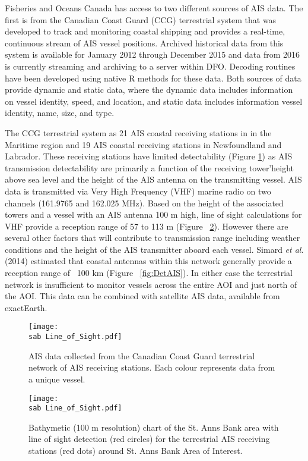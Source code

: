 \documentclass[letterpaper,portrait,11pt]{scrartcl}
\numberwithin{equation}{section}		%
\numberwithin{figure}{section}			%
\numberwithin{table}{section}				%
\newcommand{\ecomod}{\string~/ecomod_data/}   %
\newcommand{\sab}{\ecomod/mpa/sab/}   %
\begin{document}
Fisheries and Oceans Canada has access to two different sources of AIS data.  The first is from the Canadian Coast Guard (CCG) terrestrial system that was developed to track and monitoring coastal shipping and provides a real-time, continuous stream of AIS vessel positions.  Archived historical data from this system is available for January 2012 through December 2015 and data from 2016 is currently streaming and archiving to a server within DFO. Decoding routines have been developed using native R methods for these data.   Both sources of data provide dynamic and static data, where the dynamic data includes information on vessel identity, speed, and location, and static data includes information vessel identity, name, size, and type.   

The CCG terrestrial system as 21 AIS coastal receiving stations in in the Maritime region and 19 AIS coastal receiving stations in Newfoundland and Labrador.  These receiving stations have limited detectability (Figure \ref{fig:TAIS}) as AIS transmission detectability are primarily a function of the receiving tower\textquoteright height above sea level and the height of the AIS antenna on the transmitting vessel.  AIS data is transmitted via Very High Frequency (VHF) marine radio on two channels (161.9765 and 162.025 MHz).  Based on the height of the associated towers and a vessel with an AIS antenna 100 m high, line of sight calculations for VHF provide a reception range of  57 to 113 m (Figure ~\ref{fig:LOF}).  However there are several other factors that will contribute to transmission range including weather conditions and the height of the AIS transmitter aboard each vessel.  Simard \textit{et al}. (2014) estimated that coastal antennas within this network generally provide a reception range of ~100 km (Figure ~\ref{fig:DetAIS}).  In either case the terrestrial network is insufficient to monitor vessels across the entire AOI and just north of the AOI. This data can be combined with satellite AIS data, available from exactEarth.


\begin{figure}[h]
	\centering
	\texttt{[image: \\sab Line\_of\_Sight.pdf]}
	\caption{AIS data collected from the Canadian Coast Guard terrestrial network of AIS receiving stations.  Each colour represents data from a unique vessel.}
	\label{fig:TAIS}
\end{figure}


\begin{figure}[h]
	\centering
	\texttt{[image: \\sab Line\_of\_Sight.pdf]}
	\caption{Bathymetic (100 m resolution) chart of the  St. Anns Bank area with line of sight detection (red circles) for the terrestrial AIS receiving stations (red dots) around St. Anns Bank Area of Interest.}
	\label{fig:LOF}
\end{figure}
\end{document}
